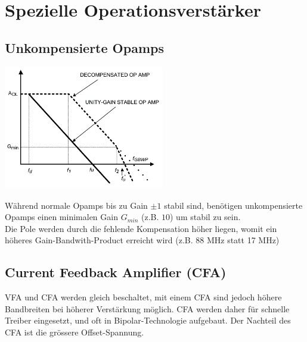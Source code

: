\section{Spezielle Operationsverstärker}

\subsection{Unkompensierte Opamps}

\begin{minipage}{9cm}
	\includegraphics[width=7cm]{images/op_uncomp.jpg}
\end{minipage}
\begin{minipage}{-9cm+\linewidth}
	Während normale Opamps bis zu Gain $\pm 1$ stabil sind, benötigen
	unkompensierte Opamps einen minimalen Gain $G_{min}$ (z.B. $10$) um
	stabil zu sein. \\
	
	Die Pole werden durch die fehlende Kompensation höher liegen, womit
	ein höheres Gain-Bandwith-Product erreicht wird (z.B. 88 MHz statt 17 MHz)
\end{minipage}


\subsection{Current Feedback Amplifier (CFA)}
VFA und CFA werden gleich beschaltet, mit einem CFA sind jedoch höhere
Bandbreiten bei höherer Verstärkung möglich. CFA werden daher für schnelle
Treiber eingesetzt, und oft in Bipolar-Technologie aufgebaut. Der Nachteil
des CFA ist die grössere Offset-Spannung. \\

